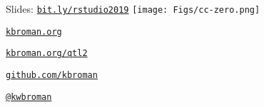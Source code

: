 \documentclass[12pt,t,aspectratio=169]{beamer}
\begin{document}
\begin{frame}[c]{}

\Large

Slides: \href{https://bit.ly/rstudio2019}{\tt bit.ly/rstudio2019} \quad
\texttt{[image: Figs/cc-zero.png]}

\vspace{7mm}

\href{https://kbroman.org}{\tt \lolit kbroman.org}

\vspace{7mm}

\href{https://kbroman.org/qtl2}{\tt kbroman.org/qtl2}

\vspace{7mm}

\href{https://github.com/kbroman}{\tt \lolit github.com/kbroman}

\vspace{7mm}

\href{https://twitter.com/kwbroman}{\tt \lolit @kwbroman}


\end{frame}
\end{document}
